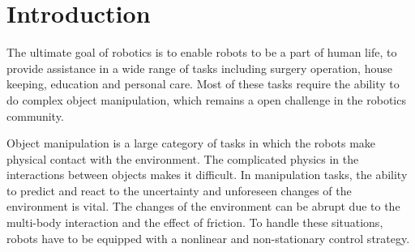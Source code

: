 \documentclass[preprint,12pt]{elsarticle}
\begin{document}


\section{Introduction}
\label{intro}
The ultimate goal of robotics is to enable robots to be a part of human life, to provide assistance in a wide range of tasks including surgery operation, house keeping, education and personal care. Most of these tasks require the ability to do complex object manipulation, which remains a open challenge in the robotics community. %

Object manipulation is a large category of tasks in which the robots make physical contact with the environment. %
The complicated physics in the interactions between objects makes it difficult.
In manipulation tasks, the ability to predict and react to the uncertainty and unforeseen changes of the environment is vital. The changes of the environment can be abrupt due to the multi-body interaction and the effect of friction. To handle these situations, robots have to be equipped with a nonlinear and non-stationary control strategy.





%
\end{document}
